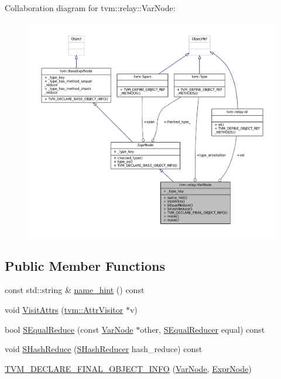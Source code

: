 Collaboration diagram for tvm\+:\+:relay\+:\+:Var\+Node\+:
\nopagebreak
\begin{figure}[H]
\begin{center}
\leavevmode
\includegraphics[width=350pt]{classtvm_1_1relay_1_1VarNode__coll__graph}
\end{center}
\end{figure}
\subsection*{Public Member Functions}
\begin{DoxyCompactItemize}
\item 
const std\+::string \& \hyperlink{classtvm_1_1relay_1_1VarNode_aa9a3d5f1c750ab4e34f23bf21daeb53d}{name\+\_\+hint} () const 
\item 
void \hyperlink{classtvm_1_1relay_1_1VarNode_a9b43f30f77f1696e11f423f4834b42af}{Visit\+Attrs} (\hyperlink{classtvm_1_1AttrVisitor}{tvm\+::\+Attr\+Visitor} $\ast$v)
\item 
bool \hyperlink{classtvm_1_1relay_1_1VarNode_abc18494ecd63c935ba379de302db95e0}{S\+Equal\+Reduce} (const \hyperlink{classtvm_1_1relay_1_1VarNode}{Var\+Node} $\ast$other, \hyperlink{classtvm_1_1SEqualReducer}{S\+Equal\+Reducer} equal) const 
\item 
void \hyperlink{classtvm_1_1relay_1_1VarNode_a79ca8344a35daed052ca91a282c58cdb}{S\+Hash\+Reduce} (\hyperlink{classtvm_1_1SHashReducer}{S\+Hash\+Reducer} hash\+\_\+reduce) const 
\item 
\hyperlink{classtvm_1_1relay_1_1VarNode_a9fc5bd45ca5ccdd0f88f3ebb7c8aebb5}{T\+V\+M\+\_\+\+D\+E\+C\+L\+A\+R\+E\+\_\+\+F\+I\+N\+A\+L\+\_\+\+O\+B\+J\+E\+C\+T\+\_\+\+I\+N\+FO} (\hyperlink{classtvm_1_1relay_1_1VarNode}{Var\+Node}, \hyperlink{namespacetvm_1_1relay_a387f18e050d016c52ea6c4781e7cff6c}{Expr\+Node})
\end{DoxyCompactItemize}
